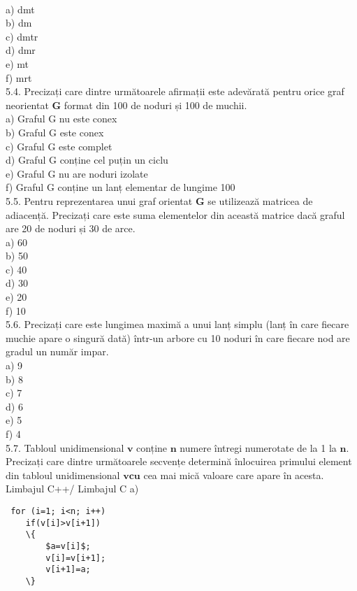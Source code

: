 \\
a) dmt
\\
b) dm
\\
c) dmtr
\\
d) dmr
\\
e) mt
\\
f) mrt
\\
5.4. Precizați care dintre următoarele afirmații este adevărată pentru orice graf neorientat $\mathbf{G}$ format din 100 de noduri și 100 de muchii.
\\
a) Graful G nu este conex
\\
b) Graful G este conex
\\
c) Graful G este complet
\\
d) Graful G conține cel puțin un ciclu
\\
e) Graful G nu are noduri izolate
\\
f) Graful G conține un lanț elementar de lungime 100
\\
5.5. Pentru reprezentarea unui graf orientat $\mathbf{G}$ se utilizează matricea de adiacență. Precizați care este suma elementelor din această matrice dacă graful are 20 de noduri și 30 de arce.
\\
a) 60
\\
b) 50
\\
c) 40
\\
d) 30
\\
e) 20
\\
f) 10
\\
5.6. Precizați care este lungimea maximă a unui lanț simplu (lanț în care fiecare muchie apare o singură dată) într-un arbore cu 10 noduri în care fiecare nod are gradul un număr impar.
\\
a) 9
\\
b) 8
\\
c) 7
\\
d) 6
\\
e) 5
\\
f) 4
\\
5.7. Tabloul unidimensional $\mathbf{v}$ conține $\mathbf{n}$ numere întregi numerotate de la 1 la $\mathbf{n}$. Precizați care dintre următoarele secvențe determină înlocuirea primului element din tabloul unidimensional $\mathbf{v} \mathbf{c u}$ cea mai mică valoare care apare în acesta.
\\
Limbajul C++/ Limbajul C
a) \begin{verbatim}
 for (i=1; i<n; i++)
    if(v[i]>v[i+1])
    \{
        $a=v[i]$;
        v[i]=v[i+1];
        v[i+1]=a;
    \}
\end{verbatim}

